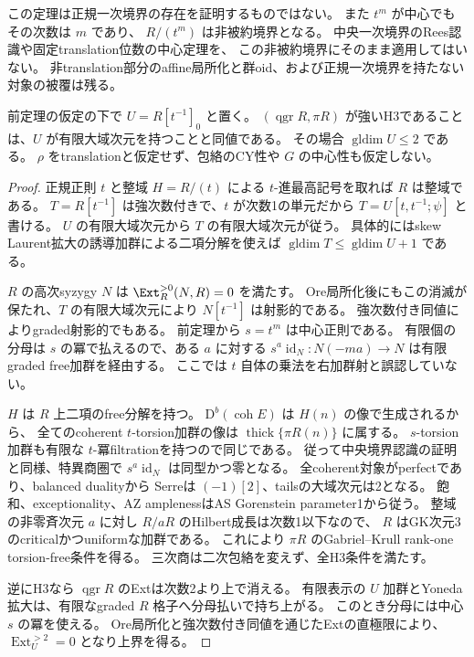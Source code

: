 この定理は正規一次境界の存在を証明するものではない。
また $t^m$ が中心でもその次数は $m$ であり、
$R/(t^m)$ は非被約境界となる。
中央一次境界のRees認識や固定translation位数の中心定理を、
この非被約境界にそのまま適用してはいない。
非translation部分のaffine局所化と群oid、および正規一次境界を持たない対象の被覆は残る。

\begin{theorem}[正規楕円境界を持つ全正規三次商のaffine認識]
\label{thm:normal-elliptic-affine-recognition}
前定理の仮定の下で $U=R[t^{-1}]_0$ と置く。
$(\operatorname{qgr}R,\pi R)$ が強いH3であることは、$U$ が有限大域次元を持つことと同値である。
その場合 $\operatorname{gldim}U\le2$ である。
$\rho$ をtranslationと仮定せず、包絡のCY性や $G$ の中心性も仮定しない。
\end{theorem}
\begin{proof}
正規正則 $t$ と整域 $H=R/(t)$ による $t$-進最高記号を取れば $R$ は整域である。
$T=R[t^{-1}]$ は強次数付きで、$t$ が次数1の単元だから
$T=U[t,t^{-1};\psi]$ と書ける。
$U$ の有限大域次元から $T$ の有限大域次元が従う。
具体的にはskew Laurent拡大の誘導加群による二項分解を使えば
$\operatorname{gldim}T\le\operatorname{gldim}U+1$ である。

$R$ の高次syzygy $N$ は $\Ext_R^{>0}(N,R)=0$ を満たす。
Ore局所化後にもこの消滅が保たれ、$T$ の有限大域次元により $N[t^{-1}]$ は射影的である。
強次数付き同値によりgraded射影的でもある。
前定理から $s=t^m$ は中心正則である。
有限個の分母は $s$ の冪で払えるので、ある $a$ に対する
$s^a\operatorname{id}_N:N(-ma)\to N$ は有限graded free加群を経由する。
ここでは $t$ 自体の乗法を右加群射と誤認していない。

$H$ は $R$ 上二項のfree分解を持つ。
$\mathrm D^b(\operatorname{coh}E)$ は $H(n)$ の像で生成されるから、
全てのcoherent $t$-torsion加群の像は $\operatorname{thick}\{\pi R(n)\}$ に属する。
$s$-torsion加群も有限な $t$-冪filtrationを持つので同じである。
従って中央境界認識の証明と同様、特異商圏で
$s^a\operatorname{id}_N$ は同型かつ零となる。
全coherent対象がperfectであり、balanced dualityから
Serreは $(-1)[2]$、tailsの大域次元は2となる。
飽和、exceptionality、AZ amplenessはAS Gorenstein parameter1から従う。
整域の非零斉次元 $a$ に対し $R/aR$ のHilbert成長は次数1以下なので、
$R$ はGK次元3のcriticalかつuniformな加群である。
これにより $\pi R$ のGabriel--Krull rank-one torsion-free条件を得る。
三次商は二次包絡を変えず、全H3条件を満たす。

逆にH3なら $\operatorname{qgr}R$ のExtは次数2より上で消える。
有限表示の $U$ 加群とYoneda拡大は、有限なgraded $R$ 格子へ分母払いで持ち上がる。
このとき分母には中心 $s$ の冪を使える。
Ore局所化と強次数付き同値を通じたExtの直極限により、
$\operatorname{Ext}_U^{>2}=0$ となり上界を得る。
\end{proof}

